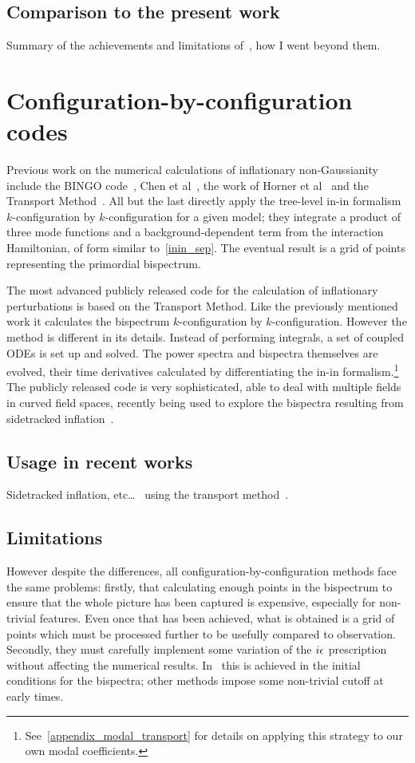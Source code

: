     \subsection{Comparison to the present work}
    Summary of the achievements and limitations of~\cite{Funakoshi}, how I went beyond them.
    \section{Configuration-by-configuration codes}
    Previous work on the numerical calculations of inflationary
non-Gaussianity include the BINGO code~\cite{BINGO},
Chen et al~\cite{chen_easther_lim_1,chen_easther_lim_2},
the work of Horner et al~\cite{horner_methods,horner_ng,horner_cs}
and the Transport Method~\cite{transport_main,transport_pytransport,transport_pytransport_2,transport_curved_3_point}.
All but the last directly apply the tree-level in-in formalism $k$-configuration by $k$-configuration for a given model;
they integrate a product of three mode functions and a background-dependent term from the interaction Hamiltonian, of form similar to~\eqref{inin_sep}.
The eventual result is a grid of points representing the primordial bispectrum.


The most advanced publicly released code for the calculation of inflationary perturbations
is based on the Transport Method.
Like the previously mentioned work it calculates the bispectrum $k$-configuration by $k$-configuration.
However the method is different in its details.
Instead of performing integrals,
a set of coupled ODEs is set up and solved.
The power spectra and bispectra themselves are evolved, their time derivatives calculated by
differentiating the in-in formalism.\footnote{See~\ref{appendix_modal_transport}
    for details on applying this strategy to our own modal coefficients.
    }
The publicly released code is very sophisticated,
able to deal with multiple fields in curved field spaces,
recently being used to explore the bispectra resulting from
sidetracked inflation~\cite{RP_1}.
    \subsection{Usage in recent works}
    Sidetracked inflation, etc\ldots~\cite{Fumagalli_2019} using the transport method~\cite{transport_pytransport_2}.
    \subsection{Limitations}
    However despite the differences, all configuration-by-configuration methods face the same problems:
firstly, that calculating enough points in the bispectrum to ensure that
the whole picture has been captured is expensive, especially for non-trivial features.
Even once that has been achieved, what is obtained is a grid of points
which must be processed further to be usefully compared to observation.
Secondly, they must carefully implement some variation
of the $i\epsilon$ prescription without affecting the numerical results.
In~\cite{transport_main} this is achieved in the initial conditions for the bispectra;
other methods impose some non-trivial cutoff at early times.

